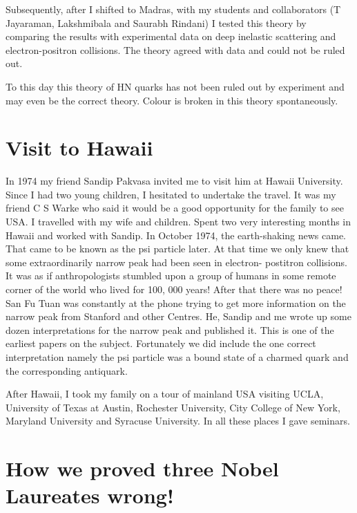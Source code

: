 Subsequently, after I shifted to Madras, with my students and 
collaborators (T Jayaraman, Lakshmibala and Saurabh Rindani) I tested 
this theory by comparing the results with experimental data on deep 
inelastic scattering and electron-positron collisions. The theory agreed 
with data and could not be ruled out.

To this day this theory of HN quarks has not been ruled out by 
experiment and may even be the correct theory. Colour is broken in this 
theory spontaneously.

\section*{Visit to Hawaii}

In 1974 my friend Sandip Pakvasa invited me to visit him at Hawaii 
University. Since I had two young children, I hesitated to undertake the 
travel. It was my friend C S Warke who said it would be a good 
opportunity for the family to see USA. I travelled with my wife and 
children. Spent two very interesting months in Hawaii and worked with 
Sandip. In October 1974, the earth-shaking news came. That came to be 
known as the psi particle later. At that time we only knew that some 
extraordinarily narrow peak had been seen in electron- postitron 
collisions. It was as if anthropologists stumbled upon a group of humans 
in some remote corner of the world who lived for 100, 000 years! After 
that there was no peace! San Fu Tuan was constantly at the phone trying 
to get more information on the narrow peak from Stanford and other 
Centres. He, Sandip and me wrote up some dozen interpretations for the 
narrow peak and published it. This is one of the earliest papers on the 
subject. Fortunately we did include the one correct interpretation 
namely the psi particle was a bound state of a charmed quark and the 
corresponding antiquark.

After Hawaii, I took my family on a tour of mainland USA visiting UCLA, 
University of Texas at Austin, Rochester University, City College of New 
York, Maryland University and Syracuse University. In all these places I 
gave seminars.

\section*{How we proved three Nobel Laureates wrong!}

